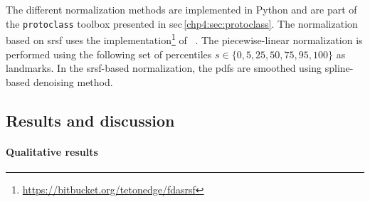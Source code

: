 The different normalization methods are implemented in Python and are part of the \texttt{protoclass} toolbox presented in \acs{sec}\,\ref{chp4:sec:protoclass}.
The normalization based on \ac{srsf} uses the implementation\footnote{\url{https://bitbucket.org/tetonedge/fdasrsf}} of \citeauthor{Tucker2013}~\cite{Tucker2013}.
The piecewise-linear normalization is performed using the following set of percentiles $s \in \{0, 5, 25, 50, 75, 95, 100 \}$ as landmarks.
In the \ac{srsf}-based normalization, the \acp{pdf} are smoothed using spline-based denoising method.

\subsection{Results and discussion}

\paragraph{Qualitative results}


